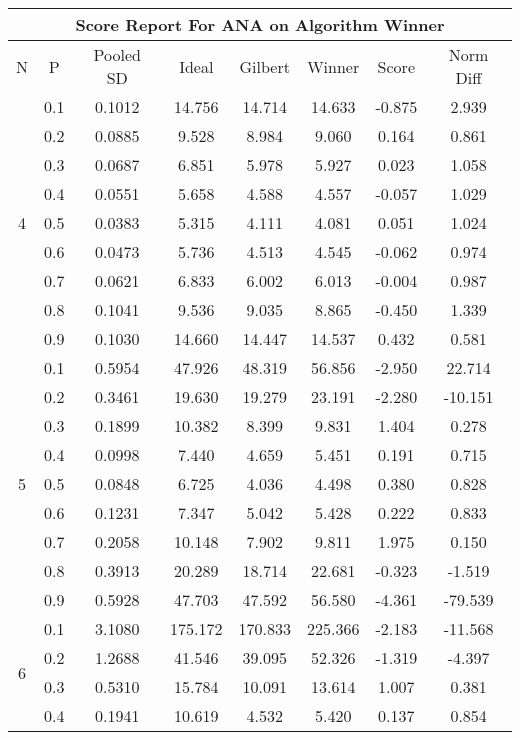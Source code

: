 \documentclass[11pt,a4paper]{report}
\begin{document}
\begin{longtable}{ | c | c || c | c | c | c | c | c | }
\hline
\multicolumn{8}{|c|}{ Score Report For ANA on Algorithm Winner} \\
\hline
N & P & Pooled SD &  Ideal &  Gilbert & Winner  & Score & Norm Diff \\
 \hline
 \hline
 \endhead
\multirow{9}{*}{4} & 0.1 & 0.1012 & 14.756 & 14.714 & 14.633 & -0.875 & 2.939 \\
 & 0.2 & 0.0885 & 9.528 & 8.984 & 9.060 & 0.164 & 0.861 \\
 & 0.3 & 0.0687 & 6.851 & 5.978 & 5.927 & 0.023 & 1.058 \\
 & 0.4 & 0.0551 & 5.658 & 4.588 & 4.557 & -0.057 & 1.029 \\
 & 0.5 & 0.0383 & 5.315 & 4.111 & 4.081 & 0.051 & 1.024 \\
 & 0.6 & 0.0473 & 5.736 & 4.513 & 4.545 & -0.062 & 0.974 \\
 & 0.7 & 0.0621 & 6.833 & 6.002 & 6.013 & -0.004 & 0.987 \\
 & 0.8 & 0.1041 & 9.536 & 9.035 & 8.865 & -0.450 & 1.339 \\
 & 0.9 & 0.1030 & 14.660 & 14.447 & 14.537 & 0.432 & 0.581 \\
 \hline
\multirow{9}{*}{5} & 0.1 & 0.5954 & 47.926 & 48.319 & 56.856 & -2.950 & 22.714 \\
 & 0.2 & 0.3461 & 19.630 & 19.279 & 23.191 & -2.280 & -10.151 \\
 & 0.3 & 0.1899 & 10.382 & 8.399 & 9.831 & 1.404 & 0.278 \\
 & 0.4 & 0.0998 & 7.440 & 4.659 & 5.451 & 0.191 & 0.715 \\
 & 0.5 & 0.0848 & 6.725 & 4.036 & 4.498 & 0.380 & 0.828 \\
 & 0.6 & 0.1231 & 7.347 & 5.042 & 5.428 & 0.222 & 0.833 \\
 & 0.7 & 0.2058 & 10.148 & 7.902 & 9.811 & 1.975 & 0.150 \\
 & 0.8 & 0.3913 & 20.289 & 18.714 & 22.681 & -0.323 & -1.519 \\
 & 0.9 & 0.5928 & 47.703 & 47.592 & 56.580 & -4.361 & -79.539 \\
 \hline
\multirow{9}{*}{6} & 0.1 & 3.1080 & 175.172 & 170.833 & 225.366 & -2.183 & -11.568 \\
 & 0.2 & 1.2688 & 41.546 & 39.095 & 52.326 & -1.319 & -4.397 \\
 & 0.3 & 0.5310 & 15.784 & 10.091 & 13.614 & 1.007 & 0.381 \\
 & 0.4 & 0.1941 & 10.619 & 4.532 & 5.420 & 0.137 & 0.854 \\

\end{longtable}
\end{document}
